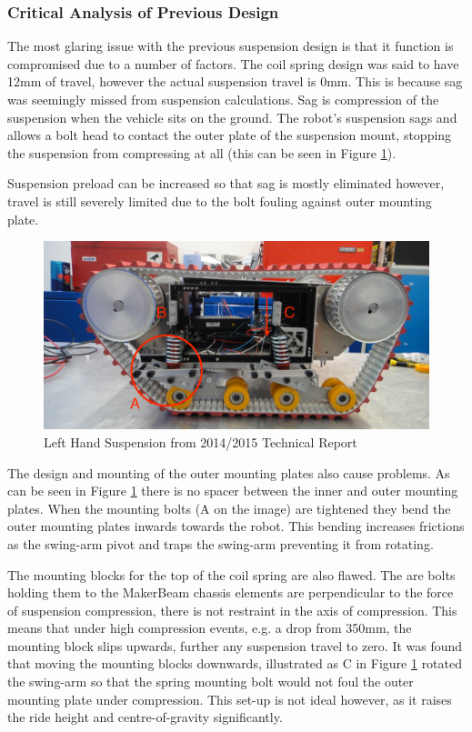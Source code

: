 \subsubsection{Critical Analysis of Previous Design}
The most glaring issue with the previous suspension design is that it function is compromised due to a number of factors. The coil spring design was said to have 12mm of travel, however the actual suspension travel is 0mm. This is because sag was seemingly missed from suspension calculations. Sag is compression of the suspension when the vehicle sits on the ground. The robot’s suspension sags and allows a bolt head to contact the outer plate of the suspension mount, stopping the suspension from compressing at all (this can be seen in Figure \ref{fig:LHOrion}). \par
Suspension preload can be increased so that sag is mostly eliminated however, travel is still severely limited due to the bolt fouling against outer mounting plate. \par
\begin{figure}[h]
\centering\includegraphics[width=0.6\linewidth]{Images/MaxImages/LHOrion.png}
\caption{Left Hand Suspension from 2014/2015 Technical Report}
\label{fig:LHOrion}
\end{figure}
The design and mounting of the outer mounting plates also cause problems. As can be seen in Figure \ref{fig:LHOrion}  there is no spacer between the inner and outer mounting plates. When the mounting bolts (A on the image) are tightened they bend the outer mounting plates inwards towards the robot. This bending increases frictions as the swing-arm pivot and traps the swing-arm preventing it from rotating.\par

The mounting blocks for the top of the coil spring are also flawed. The are bolts holding them to the MakerBeam chassis elements are perpendicular to the force of suspension compression, there is not restraint in the axis of compression. This means that under high compression events, e.g. a drop from 350mm, the mounting block slips upwards, further any suspension travel to zero. It was found that moving the mounting blocks downwards, illustrated as C in Figure \ref{fig:LHOrion}  rotated the swing-arm so that the spring mounting bolt would not foul the outer mounting plate under compression. This set-up is not ideal however, as it raises the ride height and centre-of-gravity significantly.\par

